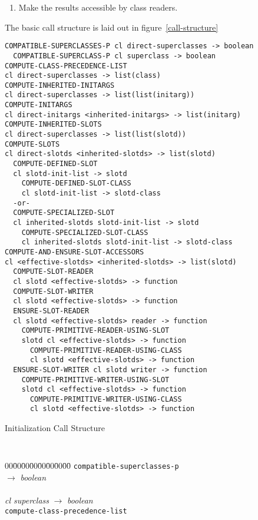 \begin{optDefinition}
\begin{enumerate}
    \item Make the results accessible by class readers.
\end{enumerate}
%
The basic call structure is laid out in figure~\ref{call-structure}
%
\begin{optPrivate}
\begin{verbatim}
COMPATIBLE-SUPERCLASSES-P cl direct-superclasses -> boolean
  COMPATIBLE-SUPERCLASS-P cl superclass -> boolean
COMPUTE-CLASS-PRECEDENCE-LIST
cl direct-superclasses -> list(class)
COMPUTE-INHERITED-INITARGS
cl direct-superclasses -> list(list(initarg))
COMPUTE-INITARGS
cl direct-initargs <inherited-initargs> -> list(initarg)
COMPUTE-INHERITED-SLOTS
cl direct-superclasses -> list(list(slotd))
COMPUTE-SLOTS
cl direct-slotds <inherited-slotds> -> list(slotd)
  COMPUTE-DEFINED-SLOT
  cl slotd-init-list -> slotd
    COMPUTE-DEFINED-SLOT-CLASS
    cl slotd-init-list -> slotd-class
  -or-
  COMPUTE-SPECIALIZED-SLOT
  cl inherited-slotds slotd-init-list -> slotd
    COMPUTE-SPECIALIZED-SLOT-CLASS
    cl inherited-slotds slotd-init-list -> slotd-class
COMPUTE-AND-ENSURE-SLOT-ACCESSORS
cl <effective-slotds> <inherited-slotds> -> list(slotd)
  COMPUTE-SLOT-READER
  cl slotd <effective-slotds> -> function
  COMPUTE-SLOT-WRITER
  cl slotd <effective-slotds> -> function
  ENSURE-SLOT-READER
  cl slotd <effective-slotds> reader -> function
    COMPUTE-PRIMITIVE-READER-USING-SLOT
    slotd cl <effective-slotds> -> function
      COMPUTE-PRIMITIVE-READER-USING-CLASS
      cl slotd <effective-slotds> -> function
  ENSURE-SLOT-WRITER cl slotd writer -> function
    COMPUTE-PRIMITIVE-WRITER-USING-SLOT
    slotd cl <effective-slotds> -> function
      COMPUTE-PRIMITIVE-WRITER-USING-CLASS
      cl slotd <effective-slotds> -> function
\end{verbatim}
\end{optPrivate}
%
\begin{table}%
\caption{Initialization Call Structure}%
\label{call-structure}%
\tt%
\begin{tabbing}%
    00\=00\=00\=00\=00\=00\=00\=00\= \kill
    {\tt compatible-superclasses-p}\\
    \>\>\>
    $\rightarrow$ {\em boolean}\\
    \\
    \>\>\>\>\> {\em cl superclass\/}
    $\rightarrow$ {\em boolean}\\
    {\tt compute-class-precedence-list}\\
    \>\>\>

\end{tabbing}
\end{table}
\end{optDefinition}

